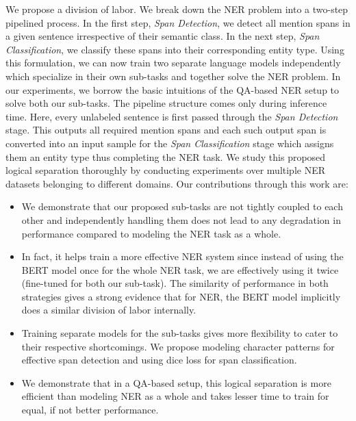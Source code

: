 We propose a division of labor. We break down the NER problem into a two-step pipelined process. In the first step, \textit{Span Detection}, we detect all mention spans in a given sentence irrespective of their semantic class. In the next step, \textit{Span Classification}, we classify these spans into their corresponding entity type. Using this formulation, we can now train two separate language models independently which specialize in their own sub-tasks and together solve the NER problem. In our experiments, we borrow the basic intuitions of the QA-based NER setup to solve both our sub-tasks. The pipeline structure comes only during inference time. Here, every unlabeled sentence is first passed through the \textit{Span Detection} stage. This outputs all required mention spans and each such output span is converted into an input sample for the \textit{Span Classification} stage which assigns them an entity type thus completing the NER task. We study this proposed logical separation thoroughly by conducting experiments over multiple NER datasets belonging to different domains. Our contributions through this work are:

\begin{itemize}
    \item We demonstrate that our proposed sub-tasks are not tightly coupled to each other and independently handling them does not lead to any degradation in performance compared to modeling the NER task as a whole. 
    
    \item In fact, it helps train a more effective NER system since instead of using the BERT model once for the whole NER task, we are effectively using it twice (fine-tuned for both our sub-task). The similarity of performance in both strategies gives a strong evidence that for NER, the BERT model implicitly does a similar division of labor internally.
    
    \item Training separate models for the sub-tasks gives more flexibility to cater to their respective shortcomings. We propose modeling character patterns for effective span detection and using dice loss for span classification.
    
    \item We demonstrate that in a QA-based setup, this logical separation is more efficient than modeling NER as a whole and takes lesser time to train for equal, if not better performance.
\end{itemize}

